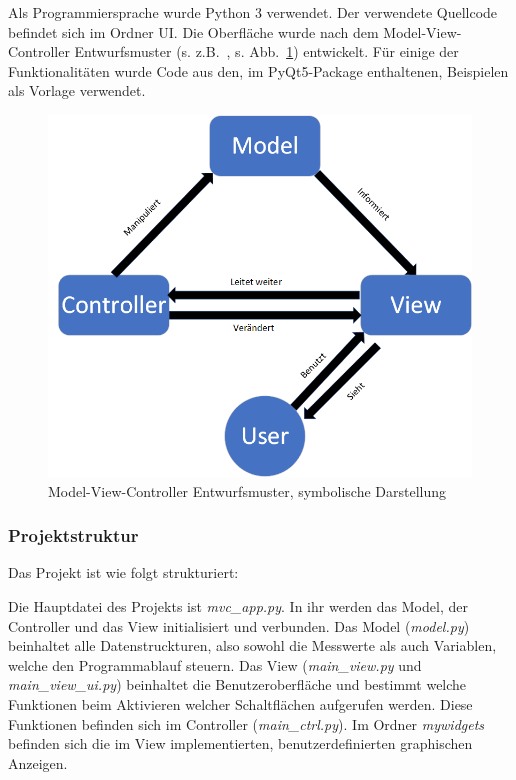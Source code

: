 Als Programmiersprache wurde Python 3 verwendet. Der verwendete Quellcode befindet sich im Ordner \textrm{UI}. Die Oberfläche wurde nach dem Model-View-Controller Entwurfsmuster (s. z.B.~\cite{deacon09}, s. Abb.~\ref{fig:ui_mvc}) entwickelt. Für einige der Funktionalitäten wurde Code aus den, im PyQt5-Package enthaltenen, Beispielen als Vorlage verwendet.
  \begin{figure}[H]
    \centering \includegraphics[width=\textwidth]{./img/MVC.png}
  \caption{Model-View-Controller Entwurfsmuster, symbolische Darstellung}\label{fig:ui_mvc}    
  \end{figure}
\subsubsection*{Projektstruktur}
Das Projekt ist wie folgt strukturiert:

Die Hauptdatei des Projekts ist \emph{mvc\_app.py}. In ihr werden das Model, der Controller und das View initialisiert und verbunden. Das Model (\emph{model.py}) beinhaltet alle Datenstruckturen, also sowohl die Messwerte als auch Variablen, welche den Programmablauf steuern. Das View (\emph{main\_view.py} und \emph{main\_view\_ui.py}) beinhaltet die Benutzeroberfläche und bestimmt welche Funktionen beim Aktivieren welcher Schaltflächen aufgerufen werden. Diese Funktionen befinden sich im Controller (\emph{main\_ctrl.py}). Im Ordner \emph{mywidgets} befinden sich die im View implementierten, benutzerdefinierten graphischen Anzeigen.

